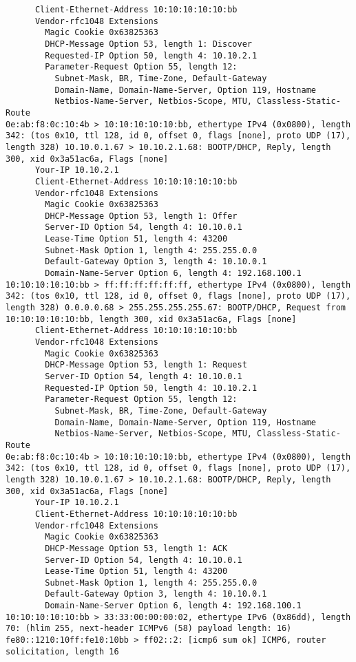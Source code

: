 \documentclass[a4paper,12pt]{article}
\begin{document}
\begin{Verbatim}
	  Client-Ethernet-Address 10:10:10:10:10:bb
	  Vendor-rfc1048 Extensions
	    Magic Cookie 0x63825363
	    DHCP-Message Option 53, length 1: Discover
	    Requested-IP Option 50, length 4: 10.10.2.1
	    Parameter-Request Option 55, length 12: 
	      Subnet-Mask, BR, Time-Zone, Default-Gateway
	      Domain-Name, Domain-Name-Server, Option 119, Hostname
	      Netbios-Name-Server, Netbios-Scope, MTU, Classless-Static-Route
0e:ab:f8:0c:10:4b > 10:10:10:10:10:bb, ethertype IPv4 (0x0800), length 342: (tos 0x10, ttl 128, id 0, offset 0, flags [none], proto UDP (17), length 328) 10.10.0.1.67 > 10.10.2.1.68: BOOTP/DHCP, Reply, length 300, xid 0x3a51ac6a, Flags [none]
	  Your-IP 10.10.2.1
	  Client-Ethernet-Address 10:10:10:10:10:bb
	  Vendor-rfc1048 Extensions
	    Magic Cookie 0x63825363
	    DHCP-Message Option 53, length 1: Offer
	    Server-ID Option 54, length 4: 10.10.0.1
	    Lease-Time Option 51, length 4: 43200
	    Subnet-Mask Option 1, length 4: 255.255.0.0
	    Default-Gateway Option 3, length 4: 10.10.0.1
	    Domain-Name-Server Option 6, length 4: 192.168.100.1
10:10:10:10:10:bb > ff:ff:ff:ff:ff:ff, ethertype IPv4 (0x0800), length 342: (tos 0x10, ttl 128, id 0, offset 0, flags [none], proto UDP (17), length 328) 0.0.0.0.68 > 255.255.255.255.67: BOOTP/DHCP, Request from 10:10:10:10:10:bb, length 300, xid 0x3a51ac6a, Flags [none]
	  Client-Ethernet-Address 10:10:10:10:10:bb
	  Vendor-rfc1048 Extensions
	    Magic Cookie 0x63825363
	    DHCP-Message Option 53, length 1: Request
	    Server-ID Option 54, length 4: 10.10.0.1
	    Requested-IP Option 50, length 4: 10.10.2.1
	    Parameter-Request Option 55, length 12: 
	      Subnet-Mask, BR, Time-Zone, Default-Gateway
	      Domain-Name, Domain-Name-Server, Option 119, Hostname
	      Netbios-Name-Server, Netbios-Scope, MTU, Classless-Static-Route
0e:ab:f8:0c:10:4b > 10:10:10:10:10:bb, ethertype IPv4 (0x0800), length 342: (tos 0x10, ttl 128, id 0, offset 0, flags [none], proto UDP (17), length 328) 10.10.0.1.67 > 10.10.2.1.68: BOOTP/DHCP, Reply, length 300, xid 0x3a51ac6a, Flags [none]
	  Your-IP 10.10.2.1
	  Client-Ethernet-Address 10:10:10:10:10:bb
	  Vendor-rfc1048 Extensions
	    Magic Cookie 0x63825363
	    DHCP-Message Option 53, length 1: ACK
	    Server-ID Option 54, length 4: 10.10.0.1
	    Lease-Time Option 51, length 4: 43200
	    Subnet-Mask Option 1, length 4: 255.255.0.0
	    Default-Gateway Option 3, length 4: 10.10.0.1
	    Domain-Name-Server Option 6, length 4: 192.168.100.1
10:10:10:10:10:bb > 33:33:00:00:00:02, ethertype IPv6 (0x86dd), length 70: (hlim 255, next-header ICMPv6 (58) payload length: 16) fe80::1210:10ff:fe10:10bb > ff02::2: [icmp6 sum ok] ICMP6, router solicitation, length 16

\end{Verbatim}
\end{document}

